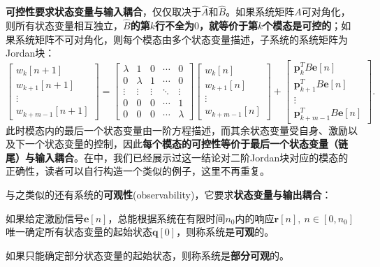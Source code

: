 \textbf{可控性要求状态变量与输入耦合}，仅仅取决于$\hat{A}$和$\hat{B}$。如果系统矩阵$A$可对角化，则所有状态变量相互独立，\textbf{$\hat{B}$的第$k$行不全为$0$，就等价于第$k$个模态是可控的}；如果系统矩阵不可对角化，则每个模态由多个状态变量描述，子系统的系统矩阵为Jordan块：
\begin{equation}
    \begin{bmatrix}
        w_k[n+1]   \\
        w_{k+1}[n+1] \\
        \vdots     \\
        w_{k+m-1}[n+1]
    \end{bmatrix}=\begin{bmatrix}
        \lambda & 1      & 0      & \cdots & 0       \\
        0       & \lambda & 1     & \cdots & 0       \\
        \vdots  & \vdots & \vdots & \ddots & \vdots  \\
        0       & 0      & 0      & \cdots & 1       \\
        0       & 0      & 0      & \cdots & \lambda
    \end{bmatrix}\begin{bmatrix}
        w_k[n]   \\
        w_{k+1}[n] \\
        \vdots   \\
        w_{k+m-1}[n]
    \end{bmatrix}+\begin{bmatrix}
        \mathbf{p}_k^T B\mathbf{e}[n]     \\
        \mathbf{p}_{k+1}^T B\mathbf{e}[n] \\
        \vdots                            \\
        \mathbf{p}_{k+m-1}^T B\mathbf{e}[n]
    \end{bmatrix}.
\end{equation}
此时模态内的最后一个状态变量由一阶方程描述，而其余状态变量受自身、激励以及下一个状态变量的控制，因此\textbf{每个模态的可控性等价于最后一个状态变量（链尾）与输入耦合}。在中，我们已经展示过这一结论对二阶Jordan块对应的模态的正确性，读者可以自行构造一个类似的例子，这里不再重复。

与之类似的还有系统的\textbf{可观性}(observability)，它要求\textbf{状态变量与输出耦合}：

\begin{definition}[可观性]
    如果给定激励信号$\mathbf{e}[n]$，总能根据系统在有限时间$n_0$内的响应$\mathbf{r}[n],\ n\in[0,n_0]$唯一确定所有状态变量的起始状态$\mathbf{q}[0]$，则称系统是\textbf{可观}的。

    如果只能确定部分状态变量的起始状态，则称系统是\textbf{部分可观}的。
\end{definition}

